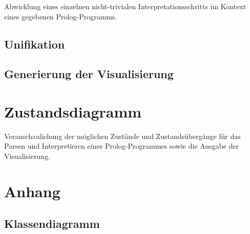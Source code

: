 \documentclass[parskip=full,11pt,twoside]{scrartcl}
\begin{document}
Abwicklung eines einzelnen nicht-trivialen Interpretationsschritts im Kontext eines gegebenen Prolog-Programms.

\subsection{Unifikation}

\subsection{Generierung der Visualisierung}

\section{Zustandsdiagramm}

Veranschaulichung der möglichen Zustände und Zustandsübergänge für das Parsen und Interpretieren eines Prolog-Programmes sowie die Ausgabe der Visualisierung.

\appendix

\section{Anhang}

\subsection{Klassendiagramm}
\end{document}
